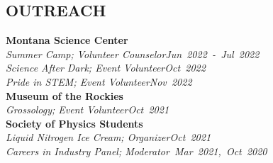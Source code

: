\documentclass[margin]{res}
\begin{document}
\begin{resume}
\section{\uppercase{Outreach}}
\textbf{Montana Science Center}\\
\hspace{3ex} {\sl Summer Camp; Volunteer Counselor}\hfill {\sl Jun~2022~-~Jul~2022}\\
\hspace{3ex} {\sl Science After Dark; Event Volunteer}\hfill {\sl Oct~2022}\\
\hspace{3ex} {\sl Pride in STEM; Event Volunteer}\hfill {\sl Nov~2022}\vspace*{1ex}\\
\textbf{Museum of the Rockies}\\
\hspace{3ex} {\sl Grossology; Event Volunteer}\hfill {\sl Oct~2021}\vspace*{1ex}\\
\textbf{Society of Physics Students}\vspace*{0.5ex}\\
\hspace{3ex} {\sl Liquid Nitrogen Ice Cream; Organizer}\hfill {\sl Oct~2021}\vspace*{0.5ex}\\
\hspace{3ex} {\sl Careers in Industry Panel; Moderator}\hfill {\sl ~Mar~2021,~Oct~2020}


%
\end{resume}

\end{document}
